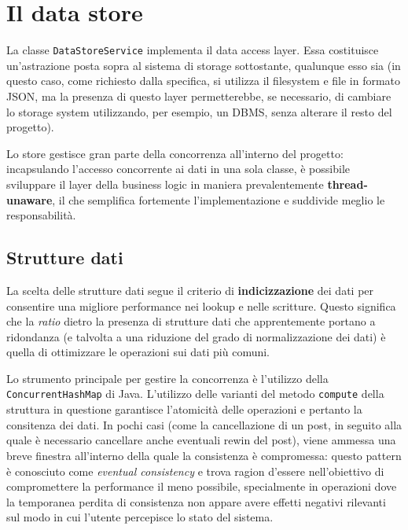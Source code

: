 \documentclass[a4paper,8pt]{article} %
\def\code#1{\texttt{#1}}
\begin{document}
\section{Il data store}
La classe \code{DataStoreService} implementa il data access layer. Essa costituisce un'astrazione posta sopra al sistema di storage sottostante, qualunque esso sia
(in questo caso, come richiesto dalla specifica, si utilizza il filesystem e file in formato JSON, ma la presenza di questo layer permetterebbe, se necessario, di cambiare lo storage system
utilizzando, per esempio, un DBMS, senza alterare il resto del progetto).
\par Lo store gestisce gran parte della concorrenza all'interno del progetto: incapsulando l'accesso concorrente ai dati in una sola classe,
è possibile sviluppare il layer della business logic in maniera prevalentemente \textbf{thread-unaware}, il che semplifica fortemente l'implementazione e suddivide meglio le responsabilità.
\subsection{Strutture dati}
La scelta delle strutture dati segue il criterio di \textbf{indicizzazione} dei dati per consentire una migliore performance nei lookup e nelle scritture. Questo significa che la \emph{ratio} dietro
la presenza di strutture dati che apprentemente portano a ridondanza (e talvolta a una riduzione del grado di normalizzazione dei dati) è quella di ottimizzare le operazioni sui dati più comuni.
\par Lo strumento principale per gestire la concorrenza è l'utilizzo della \code{ConcurrentHashMap} di Java. L'utilizzo delle varianti del metodo \code{compute} della struttura in questione garantisce l'atomicità
delle operazioni e pertanto la consitenza dei dati. In pochi casi (come la cancellazione di un post, in seguito alla quale è necessario cancellare anche eventuali rewin del post), viene ammessa una breve finestra
all'interno della quale la consistenza è compromessa: questo pattern è conosciuto come \emph{eventual consistency} e trova ragion d'essere nell'obiettivo di compromettere la performance il meno possibile, specialmente
in operazioni dove la temporanea perdita di consistenza non appare avere effetti negativi rilevanti sul modo in cui l'utente percepisce lo stato del sistema.
\end{document}
